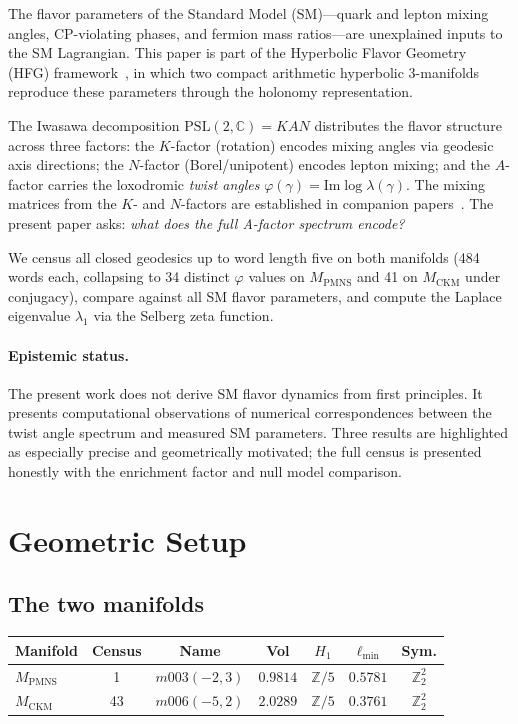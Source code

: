 \documentclass[11pt,a4paper]{article}
\theoremstyle{definition}
\theoremstyle{remark}
\newcommand{\PSL}{\mathrm{PSL}(2,\mathbb{C})}
\newcommand{\ZZ}{\mathbb{Z}}
\newcommand{\Zfive}{\mathbb{Z}/5}
\newcommand{\MPMNS}{M_{\mathrm{PMNS}}}
\newcommand{\MCKM}{M_{\mathrm{CKM}}}
\begin{document}
The flavor parameters of the Standard Model (SM)---quark and lepton
mixing angles, CP-violating phases, and fermion mass ratios---are
unexplained inputs to the SM Lagrangian.
This paper is part of the Hyperbolic Flavor Geometry (HFG)
framework~\cite{Gentry:Unified}, in which two compact arithmetic
hyperbolic 3-manifolds reproduce these parameters through the holonomy
representation.

The Iwasawa decomposition $\PSL = KAN$ distributes the flavor
structure across three factors: the $K$-factor (rotation) encodes mixing
angles via geodesic axis directions; the $N$-factor (Borel/unipotent)
encodes lepton mixing; and the $A$-factor carries the loxodromic
\emph{twist angles} $\varphi(\gamma) = \mathrm{Im}\log\lambda(\gamma)$.
The mixing matrices from the $K$- and $N$-factors are established in
companion papers~\cite{Gentry:Unified,Gentry:CKM,Gentry:PMNS}.
The present paper asks: \emph{what does the full A-factor spectrum encode?}

We census all closed geodesics up to word length five on both manifolds
(484 words each, collapsing to 34 distinct $\varphi$ values on
$\MPMNS$ and 41 on $\MCKM$ under conjugacy),
compare against all SM flavor parameters, and compute the Laplace
eigenvalue $\lambda_1$ via the Selberg zeta function.

\paragraph{Epistemic status.}
The present work does not derive SM flavor dynamics from first principles.
It presents computational observations of numerical correspondences
between the twist angle spectrum and measured SM parameters.
Three results are highlighted as especially precise and geometrically
motivated; the full census is presented honestly with the enrichment
factor and null model comparison.

\section{Geometric Setup}
\label{sec:setup}

\subsection{The two manifolds}

\begin{center}
\begin{tabular}{lcccccc}
\toprule
Manifold & Census & Name & Vol & $H_1$ & $\ell_{\min}$ & Sym. \\
\midrule
$\MPMNS$ & 1 & $m003(-2,3)$ & $0.9814$ & $\Zfive$ & $0.5781$ & $\ZZ_2^2$ \\
$\MCKM$  & 43 & $m006(-5,2)$ & $2.0289$ & $\Zfive$ & $0.3761$ & $\ZZ_2^2$ \\
\bottomrule
\end{tabular}
\end{center}
\end{document}
